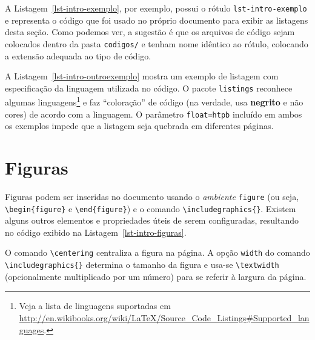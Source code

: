 A Listagem~\ref{lst-intro-exemplo}, por exemplo, possui o rótulo \texttt{lst-intro-exemplo} e representa o código que foi usado no próprio documento para exibir as listagens desta seção. Como podemos ver, a sugestão é que os arquivos de código sejam colocados dentro da pasta \texttt{codigos/} e tenham nome idêntico ao rótulo, colocando a extensão adequada ao tipo de código.



A Listagem~\ref{lst-intro-outroexemplo} mostra um exemplo de listagem com especificação da linguagem utilizada no código. O pacote \texttt{listings} reconhece algumas linguagens\footnote{Veja a lista de linguagens suportadas em \url{http://en.wikibooks.org/wiki/LaTeX/Source\_Code\_Listings\#Supported_languages}.} e faz ``coloração'' de código (na verdade, usa \textbf{negrito} e não cores) de acordo com a linguagem. O parâmetro \texttt{float=htpb} incluído em ambos os exemplos impede que a listagem seja quebrada em diferentes páginas.





\section{Figuras}
\label{sec-intro-figuras}

Figuras podem ser inseridas no documento usando o \emph{ambiente} \texttt{figure} (ou seja, \texttt{\textbackslash begin\{figure\}} e \texttt{\textbackslash end\{figure\}}) e o comando \texttt{\textbackslash includegraphics\{\}}. Existem alguns outros elementos e propriedades úteis de serem configuradas, resultando no código exibido na Listagem~\ref{lst-intro-figuras}.



O comando \texttt{\textbackslash centering} centraliza a figura na página. A opção \texttt{width} do comando \texttt{\textbackslash includegraphics\{\}} determina o tamanho da figura e usa-se \texttt{\textbackslash textwidth} (opcionalmente multiplicado por um número) para se referir à largura da página.


